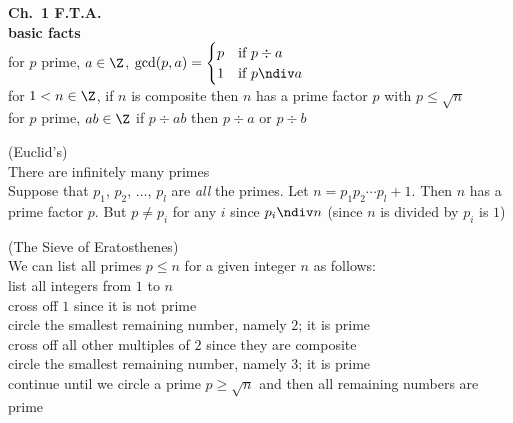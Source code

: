 \textbf{Ch.~1 F.T.A.} \\
\textbf{basic facts} \\
for $p$ prime, $a\in\Z$, $\gcd(p,a)=\begin{cases}
p & \text{if $p\div a$} \\
1 & \text{if $p\ndiv a$}
\end{cases}$ \\
for $1<n\in\Z$, if $n$ is composite then $n$ has a prime factor $p$ with $p\leq\sqrt n$ \\
for $p$ prime, $ab\in\Z$ if $p\div ab$ then $p\div a$ or $p\div b$

\thm (Euclid's) \\
There are infinitely many primes \\
\pf Suppose that $p_1$, $p_2$, $\dotsc$, $p_l$ are \emph{all} the primes.
Let $n=p_1p_2\dotsm p_l+1$.  Then $n$ has a prime factor $p$.  But $p\neq p_i$ for any $i$ since $p_i\ndiv n$ (since $n$ is divided by $p_i$ is $1$)

\thm (The Sieve of Eratosthenes) \\
We can list all primes $p\leq n$ for a given integer $n$ as follows: \\
list all integers from $1$ to $n$ \\
cross off $1$ since it is not prime \\
circle the smallest remaining number, namely $2$; it is prime \\
cross off all other multiples of $2$ since they are composite \\
circle the smallest remaining number, namely $3$; it is prime \\
continue until we circle a prime $p\geq\sqrt n$ and then all remaining numbers are prime

